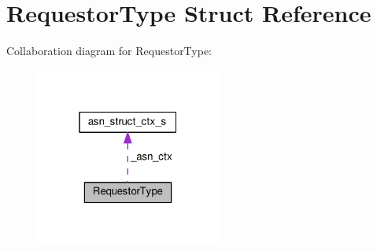 \hypertarget{structRequestorType}{}\section{Requestor\+Type Struct Reference}
\label{structRequestorType}


Collaboration diagram for Requestor\+Type\+:\nopagebreak
\begin{figure}[H]
\begin{center}
\leavevmode
\includegraphics[width=172pt]{structRequestorType__coll__graph}
\end{center}
\end{figure}
